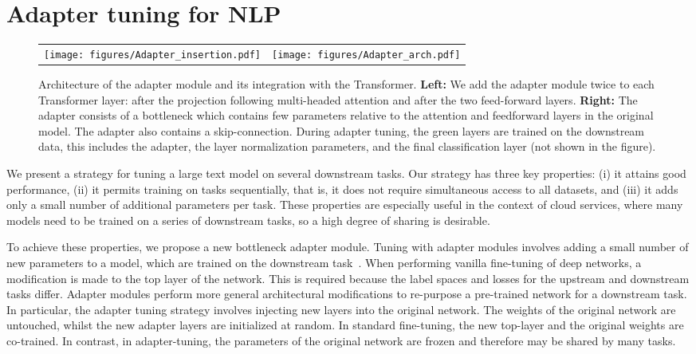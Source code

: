 \documentclass{article}
\begin{document}
 \section{Adapter tuning for NLP}

\begin{SCfigure*}
\begin{tabular}{cc}
 \texttt{[image: figures/Adapter\_insertion.pdf]}&
 \texttt{[image: figures/Adapter\_arch.pdf]}
\end{tabular}
 \caption{
 Architecture of the adapter module and its integration with the Transformer.
 \textbf{Left:} We add the adapter module twice to each Transformer layer:
 after the projection following multi-headed attention and after the two feed-forward layers.
 \textbf{Right:} The adapter consists of a bottleneck which contains few parameters relative to the attention and feedforward layers in the original model.
 The adapter also contains a skip-connection.
 During adapter tuning, the green layers are trained on the downstream data, this includes the adapter, the layer normalization parameters,
 and the final classification layer (not shown in the figure).
 \label{fig:adapters_transformer}}
\end{SCfigure*}

We present a strategy for tuning a large text model on several downstream tasks.
Our strategy has three key properties:
(i) it attains good performance,
(ii) it permits training on tasks sequentially, that is, it does not require simultaneous access to all datasets,
and (iii) it adds only a small number of additional parameters per task.
These properties are especially useful in the context of cloud services,
where many models need to be trained on a series of downstream tasks, so a high degree of sharing is desirable.

To achieve these properties, we propose a new bottleneck adapter module.
Tuning with adapter modules involves adding a small number of new parameters to a model, which are trained on the downstream task~\citep{rebuffi2017}.
When performing vanilla fine-tuning of deep networks, a modification is made to the top layer of the network.
This is required because the label spaces and losses for the upstream and downstream tasks differ.
Adapter modules perform more general architectural modifications to re-purpose a pre-trained network for a downstream task.
In particular, the adapter tuning strategy involves injecting new layers into the original network.
The weights of the original network are untouched, whilst the new adapter layers are initialized at random.
In standard fine-tuning, the new top-layer and the original weights are co-trained.
In contrast, in adapter-tuning, the parameters of the original network are frozen and therefore may be shared by many tasks.
\end{document}
